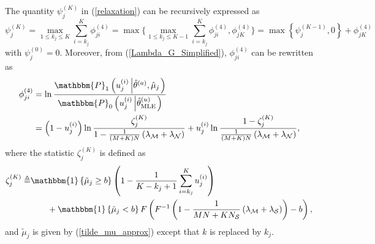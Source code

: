 \documentclass[11pt, draftclsnofoot, onecolumn]{IEEEtran}
\newcommand{\bbP}{\mathbbm{P}}
\newcommand{\cS}{\mathcal{S}}
\newcommand{\bone}{\mathbbm{1}}
\begin{document}

The quantity $\psi _j^{(K)}$ in (\ref{relaxation}) can be recursively expressed as
\begin{equation} \label{psi_recursive}
\psi _j^{(K)} = \mathop {\max }\limits_{1 \le {k_j} \le K} \sum\limits_{i = {k_j}}^K {\phi _{ji}^{\left( 4 \right)}} 
=  \max \bigg\{ {\mathop {\max }\limits_{1 \le {k_j} \le K - 1} \sum\limits_{i = {k_j}}^K {\phi _{ji}^{\left( 4 \right)}} ,\phi _{jK}^{\left( 4 \right)}} \bigg\} 
= \max \left\{ {\psi _j^{(K - 1)},0} \right\} + \phi _{jK}^{\left( 4 \right)}
\end{equation}
with $\psi _j^{(0)}=0$.
Moreover, from (\ref{Lambda_G_Simplified}), ${\phi _{ji}^{\left( 4 \right)}}$ can be rewritten as
\begin{align} \notag
\phi _{ji}^{\left( 4 \right)} & = \ln \frac{{{\bbP_1}\left( {u_j^{(i)}\left| {{{\hat \theta }^{(a)}},{{\hat \mu }_j}} \right.} \right)}}{{{\bbP_0}\left( {u_j^{(i)}\left| {\hat \theta _{{\rm{MLE}}}^{(u)}} \right.} \right)}}\\  \label{psi_ji_4_simplified}
& = \left( {1 - u_j^{(i)}} \right)\ln \frac{{\zeta _j^{(K)}}}{{1 - \frac{1}{{\left( {M + K} \right)N}}\left( {{\lambda _{\cal M}} + {\lambda _{\cal N}}} \right)}} + u_j^{(i)}\ln \frac{{1 - \zeta _j^{(K)}}}{{\frac{1}{{\left( {M + K} \right)N}}\left( {{\lambda _{\cal M}} + {\lambda _{\cal N}}} \right)}},
\end{align}
where the statistic ${\zeta _j^{(K)}}$ is defined as
\begin{align} \notag
\zeta _j^{(K)} \triangleq & \bone\left\{ {{{\tilde \mu }_j} \ge b} \right\}\left( {1 - \frac{1}{{K - {k_j} + 1}}\sum\limits_{i = {k_j}}^K {u_j^{(i)}} } \right) \\ \label{zeta_jK_define}
& \qquad + \bone\left\{ {{{\tilde \mu }_j} < b} \right\}F\left( {{F^{ - 1}}\left( {1  - \frac{1}{{{MN + KN_{\cS}}}}\left( {{\lambda _{\cal M}} + {\lambda _{\cal S}}} \right)} \right) - b} \right),
\end{align}
and ${{\tilde \mu }_j}$ is given by (\ref{tilde_mu_approx}) except that $k$ is replaced by $k_j$.
\end{document}
